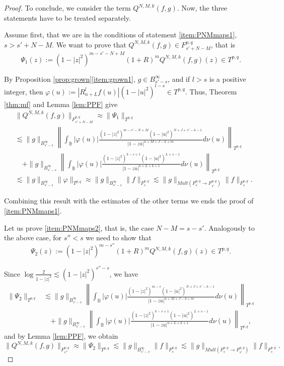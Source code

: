 \documentclass[12pt,twoside,leqno,final]{amsart}
\theoremstyle{plain}
\begin{document}
\begin{proof}
To conclude, we consider the term $Q^{N,M,k}(f,g)$. Now, the three statements have to be treated separately. 
 

Assume first, that we are in the conditions of statement \eqref{item:PNMmaps1},  $s>s'+N-M$. We want to prove that $ Q^{N,M,k}(f,g)\in F^{p,q}_{s'+N-M}$, that is  
\begin{equation*}
\Psi_1(z):=(1-|z|^2)^{m-s'-N+M}(1+R)^m  Q^{N,M,k}(f,g)(z)\in T^{p,q}.
\end{equation*}

By Proposition \ref{prop:grown}\eqref{item:grown1}, $g\in B^\infty_{s'-s}$, 
and if $l>s$ is a positive integer, then  
$\varphi(u):=|R^l_{n+L}f(u)|(1-|u|^2)^{l-s}\in T^{p,q}$. Thus, Theorem \ref{thm:mf} and 
Lemma \ref{lem:PPF} give 
\begin{align*}
&\|Q^{N,M,k}(f,g)\|_{F^{p,q}_{s'+N-M}}\approx \|\Psi_1\|_{T^{p,q}}\\
&\lesssim 
\|g\|_{B^\infty_{s'-s}}\left\|\int_{{\mathbb B}} |\varphi(u)| 
\frac{(1-|z|^2)^{m-s'-N+M}(1-|u|^2)^{N+J+s'-k-1}}{|1-z\overline u|^{n+M+J-k+m}} d\nu(u)\right\|_{T^{p,q}}\\
&\quad+\|g\|_{B^\infty_{s'-s}} 
\left\|\int_{{\mathbb B}} |\varphi(u)|\frac{(1-|z|^2)^{k-s+1}(1-|u|^2)^{L+s-1}}
{|1-z\overline u|^{n+L+k+1}}d\nu(u)\right\|_{T^{p,q}}\\
&\lesssim \|g\|_{B^\infty_{s'-s}}\|\varphi\|_{T^{p,q}}\approx \|g\|_{B^\infty_{s'-s}}\|f\|_{F^{p,q}_s}
\lesssim \|g\|_{Mult(F^{p,q}_s\to F^{p,q}_{s'})}\|f\|_{F^{p,q}_s}.
\end{align*}

Combining this result with the estimates of the other terms we ends 
the proof of \eqref{item:PNMmaps1}.

Let us prove \eqref{item:PNMmaps2}, that is, the case  $N-M=s-s'$. Analogously to the above case,  
for $s''<s$ we need to show that  
\begin{equation*}
\Psi_2(z):=(1-|z|^2)^{m-s''}(1+R)^m  Q^{N,M,k}(f,g)(z)\in T^{p,q}.
\end{equation*}

 
Since $\log\frac {2}{1-|z|^2} \lesssim (1-|z|^2)^{s''-s}$, we have
\begin{align*}
\|\Psi_2\|_{T^{p,q}}
&\lesssim 
\|g\|_{B^\infty_{s'-s}}\left\|\int_{{\mathbb B}} |\varphi(u)| 
\frac{(1-|z|^2)^{m-s}(1-|u|^2)^{N+J+s'-k-1}}{|1-z\overline u|^{n+M+J-k+m}} d\nu(u)\right\|_{T^{p,q}}\\
&\quad+\|g\|_{B^\infty_{s'-s}} 
\left\|\int_{{\mathbb B}} |\varphi(u)|\frac{(1-|z|^2)^{k-s+1}(1-|u|^2)^{L+s-1}}{|1-z\overline u|^{n+L+k+1}}d\nu(u)\right\|_{T^{p,q}},
\end{align*}
and by Lemma \ref{lem:PPF}, we obtain 
$$
\| Q^{N,M,k}(f,g)\|_{F^{p,q}_{s''}}\approx \|\Psi_2\|_{T^{p,q}}
\lesssim \|g\|_{B^\infty_{s'-s}}\|f\|_{F^{p,q}_s}
\lesssim \|g\|_{Mult(F^{p,q}_s\to F^{p,q}_{s'})}\|f\|_{F^{p,q}_s}.
$$ 


\end{proof}
\end{document}
